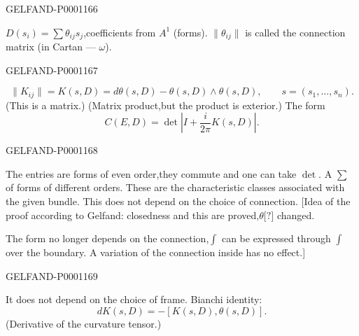 \begin{GelfandAdjacentEvidence}{GELFAND-P000116}{6}


$D(s_i)=\sum\theta_{ij}s_j$,coefficients from $A^1$ (forms).
$\|\theta_{ij}\|$ is called the connection matrix (in Cartan — $\omega$).
\end{GelfandAdjacentEvidence}
\begin{GelfandAdjacentEvidence}{GELFAND-P000116}{7}

\begin{equation*}
\|K_{ij}\|=K(s,D)=d\theta(s,D)-\theta(s,D)\wedge\theta(s,D),
\qquad s=(s_1,\ldots,s_n).
\end{equation*}
(This is a matrix.) (Matrix product,but the product is exterior.)
The form
\begin{equation*}C(E,D)=\det\left|I+\frac{i}{2\pi}K(s,D)\right|.\end{equation*}
\end{GelfandAdjacentEvidence}
\begin{GelfandAdjacentEvidence}{GELFAND-P000116}{8}

The entries are forms of even order,they commute and one can take $\det$.
A $\sum$ of forms of different orders. These are the characteristic classes
associated with the given bundle. This does not depend on the choice of connection.
[Idea of the proof according to Gelfand: closedness and this are proved,$\theta\text{[?]}$ changed.

The form no longer depends on the connection,$\int$ can be expressed through
$\int$ over the boundary. A variation of the connection inside has no effect.]
\end{GelfandAdjacentEvidence}
\begin{GelfandAdjacentEvidence}{GELFAND-P000116}{9}


It does not depend on the choice of frame.
Bianchi identity:
\begin{equation*}dK(s,D)=-[K(s,D),\theta(s,D)].\end{equation*}
(Derivative of the curvature tensor.)
\end{GelfandAdjacentEvidence}
